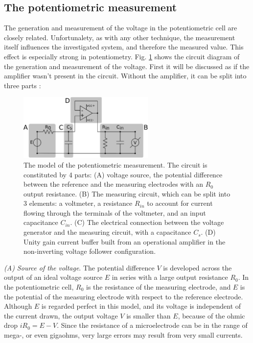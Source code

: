 		\subsection{The potentiometric measurement}
The generation and measurement of the voltage in the potentiometric cell are closely related.
Unfortunalety, as with any other technique, the measurement itself influences the investigated system, and therefore the measured value.
This effect is especially strong in potentiometry.
Fig. \ref{fig:loading_error} shows the circuit diagram of the generation and measurement of the voltage.
First it will be discussed as if the amplifier wasn't present in the circuit.
Without the amplifier, it can be split into three parts \cite{halliwell1987using}:

\begin{figure}
\centering
\includegraphics[width=0.6\textwidth]{img/theory/loading_error_2.eps}
\caption[The model of the potentiometric measurement.]{The model of the potentiometric measurement. The circuit is constituted by 4 parts: (A) voltage source, the potential difference between the reference and the measuring electrodes with an $R_0$ output resistance. (B) The measuring circuit, which can be split into 3 elements: a voltmeter, a resistance $R_{in}$ to account for current flowing through the terminals of the voltmeter, and an input capacitance $C_{in}$. (C) The electrical connection between the voltage generator and the measuring circuit, with a capacitance $C_s$. (D) Unity gain current buffer built from an operational amplifier in the non-inverting voltage follower configuration.}
\label{fig:loading_error}
\end{figure}

\emph{(A) Source of the voltage}.
The potential difference $V$ is developed across the output of an ideal voltage source $E$ in series with a large output resistance $R_0$.
In the potentiometric cell, $R_0$ is the resistance of the measuring electrode, and $E$ is the potential of the measuring electrode with respect to the reference electrode.
Although $E$ is regarded perfect in this model, and its voltage is independent of the current drawn, the output voltage $V$ is smaller than $E$, because of the ohmic drop $iR_0 = E - V$.
Since the resistance of a microelectrode can be in the range of mega-, or even gigaohms, very large errors may result from very small currents.

